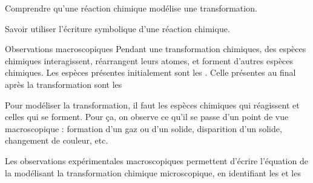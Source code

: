 \sndEnTeteSix

\vspace*{-40pt}

\begin{objectifs}
  \item Comprendre qu'une réaction chimique modélise une transformation.
  \item Savoir utiliser l'écriture symbolique d'une réaction chimique.
\end{objectifs}

  


\begin{doc}{Observations macroscopiques}
  Pendant une transformation chimiques, des espèces chimiques interagissent, réarrangent leurs atomes, et forment d'autres espèces chimiques.
  Les espèces présentes initialement sont les . Celle présentes au final après la transformation sont les 
  
  Pour modéliser la transformation, il faut  les espèces chimiques qui réagissent et celles qui se forment.
  Pour ça, on observe ce qu'il se passe d'un point de vue macroscopique : formation d'un gaz ou d'un solide, disparition d'un solide, changement de couleur, etc.
  
  \begin{encart}
    Les observations expérimentales macroscopiques permettent d'écrire l'équation de la  modélisant la transformation chimique microscopique, en identifiant les  et les 
  \end{encart}
\end{doc}

